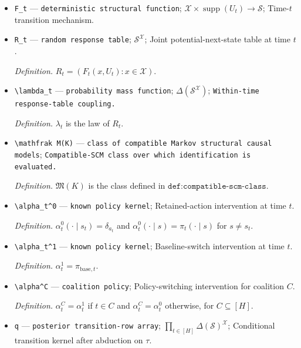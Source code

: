 \documentclass{article}
\begin{document}
\begin{itemize}
  \item \texttt{F\_\allowbreak{}t} --- \texttt{deterministic structural function}; \(\mathcal X\times\operatorname{supp}(U_t)\to\mathcal S\); Time-\(t\) transition mechanism.
  \item \texttt{R\_\allowbreak{}t} --- \texttt{random response table}; \(\mathcal S^{\mathcal X}\); Joint potential-next-state table at time \(t\).
  \par\smallskip\noindent\emph{Definition.} \(R_t=(F_t(x,U_t):x\in\mathcal X)\).
  \item \texttt{\textbackslash{}\allowbreak{}lambda\_\allowbreak{}t} --- \texttt{probability mass function}; \(\Delta(\mathcal S^{\mathcal X})\); \texttt{Within-\allowbreak{}time response-\allowbreak{}table coupling.}
  \par\smallskip\noindent\emph{Definition.} \(\lambda_t\) is the law of \(R_t\).
  \item \texttt{\textbackslash{}\allowbreak{}mathfrak M(K)} --- \texttt{class of compatible Markov structural causal models}; \texttt{Compatible-\allowbreak{}SCM class over which identification is evaluated.}
  \par\smallskip\noindent\emph{Definition.} \(\mathfrak M(K)\) is the class defined in \(\texttt{def:compatible-scm-class}\).
  \item \texttt{\textbackslash{}\allowbreak{}alpha\_\allowbreak{}t\textasciicircum{}0} --- \texttt{known policy kernel}; Retained-action intervention at time \(t\).
  \par\smallskip\noindent\emph{Definition.} \(\alpha_t^0(\cdot\mid s_t)=\delta_{a_t}\) and \(\alpha_t^0(\cdot\mid s)=\pi_t(\cdot\mid s)\) for \(s\ne s_t\).
  \item \texttt{\textbackslash{}\allowbreak{}alpha\_\allowbreak{}t\textasciicircum{}1} --- \texttt{known policy kernel}; Baseline-switch intervention at time \(t\).
  \par\smallskip\noindent\emph{Definition.} \(\alpha_t^1=\pi_{\mathrm{base},t}\).
  \item \texttt{\textbackslash{}\allowbreak{}alpha\textasciicircum{}C} --- \texttt{coalition policy}; Policy-switching intervention for coalition \(C\).
  \par\smallskip\noindent\emph{Definition.} \(\alpha_t^C=\alpha_t^1\) if \(t\in C\) and \(\alpha_t^C=\alpha_t^0\) otherwise, for \(C\subseteq[H]\).
  \item \texttt{q} --- \texttt{posterior transition-\allowbreak{}row array}; \(\prod_{t\in[H]}\Delta(\mathcal S)^{\mathcal X}\); Conditional transition kernel after abduction on \(\tau\).

\end{itemize}
\end{document}
